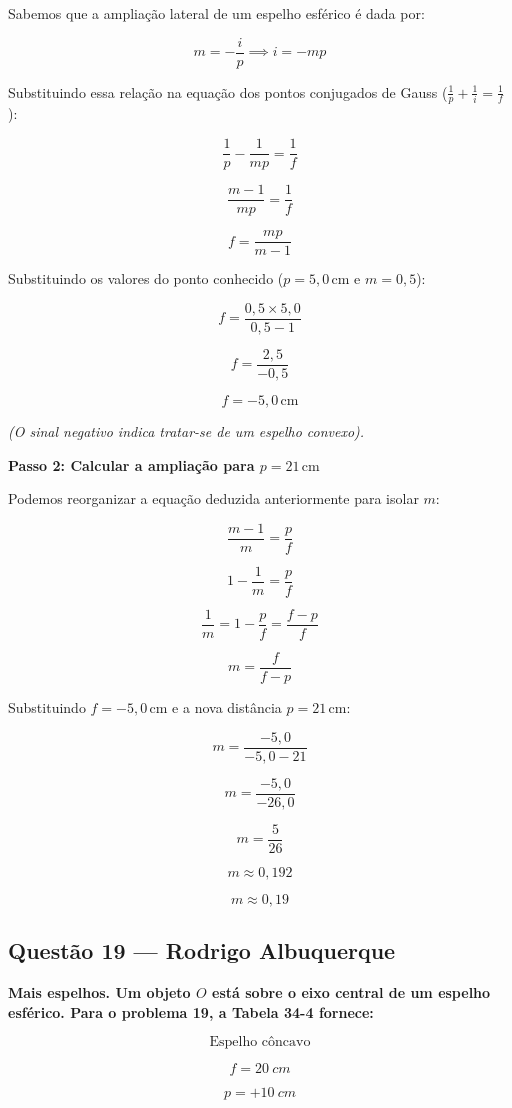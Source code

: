\documentclass[12pt,a4paper]{article}
\begin{document}
Sabemos que a ampliação lateral de um espelho esférico é dada por:

\[
m = -\frac{i}{p} \implies i = -mp
\]

Substituindo essa relação na equação dos pontos conjugados de Gauss (\(\frac{1}{p} + \frac{1}{i} = \frac{1}{f}\)):

\[
\frac{1}{p} - \frac{1}{mp} = \frac{1}{f}
\]

\[
\frac{m - 1}{mp} = \frac{1}{f}
\]

\[
f = \frac{mp}{m - 1}
\]

Substituindo os valores do ponto conhecido (\(p = 5,0\,\text{cm}\) e \(m = 0,5\)):

\[
f = \frac{0,5 \times 5,0}{0,5 - 1}
\]

\[
f = \frac{2,5}{-0,5}
\]

\[
f = -5,0\,\text{cm}
\]

\textit{(O sinal negativo indica tratar-se de um espelho convexo).}

\textbf{Passo 2: Calcular a ampliação para \(p = 21\,\text{cm}\)}

Podemos reorganizar a equação deduzida anteriormente para isolar \(m\):

\[
\frac{m - 1}{m} = \frac{p}{f}
\]

\[
1 - \frac{1}{m} = \frac{p}{f}
\]

\[
\frac{1}{m} = 1 - \frac{p}{f} = \frac{f - p}{f}
\]

\[
m = \frac{f}{f - p}
\]

Substituindo \(f = -5,0\,\text{cm}\) e a nova distância \(p = 21\,\text{cm}\):

\[
m = \frac{-5,0}{-5,0 - 21}
\]

\[
m = \frac{-5,0}{-26,0}
\]

\[
m = \frac{5}{26}
\]

\[
m \approx 0,192
\]

\[
\boxed{m \approx 0,19}
\]

\subsection{Questão 19 — Rodrigo Albuquerque}

\textbf{ Mais espelhos. Um objeto \(O\) está sobre o eixo central de um espelho esférico. Para o problema 19, a Tabela 34-4 fornece:}

\[
\text{Espelho côncavo}
\]

\[
f=20\ cm
\]

\[
p=+10\ cm
\]
\end{document}
